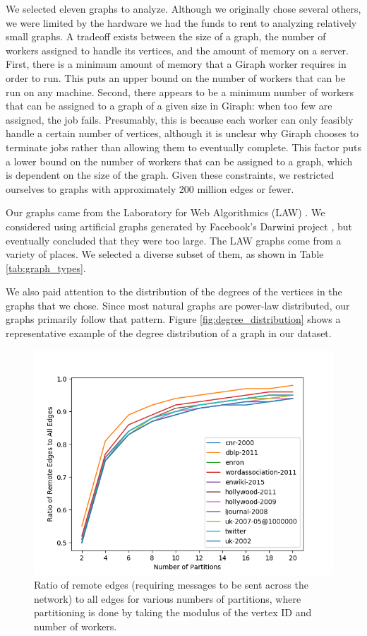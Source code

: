 We selected eleven graphs to analyze. Although we originally chose several 
others, we were limited by the hardware we had the funds to rent to analyzing 
relatively small graphs. A tradeoff exists between the size of a graph, the 
number of workers assigned to handle its vertices, and the amount of memory on 
a server. First, there is a minimum amount of memory that a Giraph worker 
requires in 
order to run. This puts an upper bound on the number of workers that can be run 
on any machine. Second, there appears to be a minimum number of workers that 
can be assigned to a graph of a given size in Giraph: when too few are 
assigned, the job fails. Presumably, this is because each worker can only 
feasibly handle a certain number of vertices, although it is unclear why Giraph 
chooses to terminate jobs rather than allowing them to eventually complete. 
This factor puts a lower bound on the number of workers that can be assigned to 
a graph, which is dependent on the size of the graph. Given these constraints, 
we restricted ourselves to graphs with approximately 200 million edges or fewer.

Our graphs came from the Laboratory for Web Algorithmics (LAW)
\cite{BoVWFI, BRSLLP}. We considered using artificial graphs generated by 
Facebook's Darwini project \cite{edunov_darwini:_2016}, but eventually 
concluded that they were too large. The LAW graphs come 
from a variety of places. We selected a diverse subset of them, as shown in 
Table \ref{tab:graph_types}.

We also paid attention to the distribution of the degrees of the vertices in 
the graphs that we chose. Since most natural graphs are power-law distributed, 
our graphs primarily follow that pattern. Figure \ref{fig:degree_distribution} 
shows a representative example of the degree distribution of a graph in our 
dataset. 

\begin{figure}[!t]
	\centering
	\includegraphics[width=\columnwidth]{../good_plots/remote_to_all_modulo.png}
	\caption{Ratio of remote edges (requiring messages to be sent across the 
	network) to all edges for various numbers of partitions, where partitioning 
	is done by taking the modulus of the vertex ID and number of workers.}
	\label{fig:remote_to_all_mod}
\end{figure}

